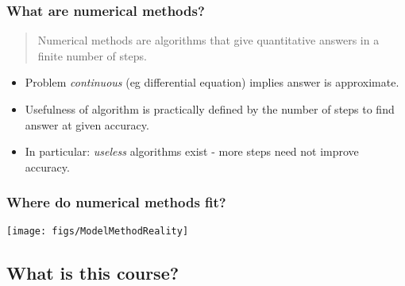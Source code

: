 \documentclass{beamer}
\begin{document}
\begin{frame}
  \frametitle{What are numerical methods?}

  \begin{quotation}
    Numerical methods are algorithms that give quantitative answers in
    a finite number of steps.
  \end{quotation}
  \pause
  \begin{itemize}
  \item Problem \emph{continuous} (eg
    differential equation) implies answer is  approximate.\pause
  \item Usefulness of algorithm is practically defined by the
    number of steps to find answer at given accuracy.\pause
  \item In particular: \emph{useless}
    algorithms exist - more steps need not improve accuracy.
  \end{itemize}

\end{frame}


\begin{frame}
  \frametitle{Where do numerical methods fit?}

  \begin{center}
    \texttt{[image: figs/ModelMethodReality]}
  \end{center}

\end{frame}


\subsection{What is this course?}
\end{document}
